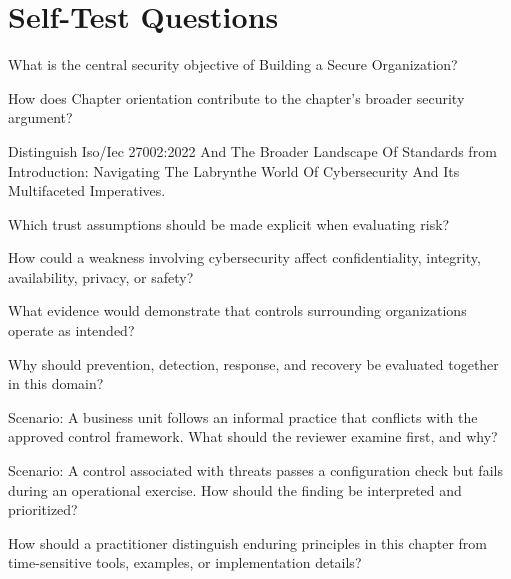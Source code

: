 \documentclass[11pt,letterpaper]{article}
\begin{document}
\section*{Self-Test Questions}
\begin{CornellRecallList}
\item What is the central security objective of Building a Secure Organization?
\item How does Chapter orientation contribute to the chapter's broader security argument?
\item Distinguish Iso/Iec 27002:2022 And The Broader Landscape Of Standards from Introduction: Navigating The Labrynthe World Of Cybersecurity And Its Multifaceted Imperatives.
\item Which trust assumptions should be made explicit when evaluating risk?
\item How could a weakness involving cybersecurity affect confidentiality, integrity, availability, privacy, or safety?
\item What evidence would demonstrate that controls surrounding organizations operate as intended?
\item Why should prevention, detection, response, and recovery be evaluated together in this domain?
\item Scenario: A business unit follows an informal practice that conflicts with the approved control framework. What should the reviewer examine first, and why?
\item Scenario: A control associated with threats passes a configuration check but fails during an operational exercise. How should the finding be interpreted and prioritized?
\item How should a practitioner distinguish enduring principles in this chapter from time-sensitive tools, examples, or implementation details?
\end{CornellRecallList}
\end{document}
